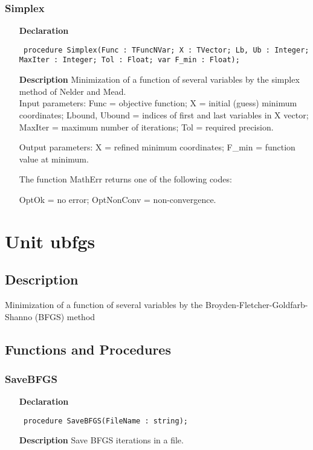 \documentclass[12pt,a4paper,oneside]{report}
\newcommand{\declarationitem}[1]{\textbf{#1}}
\newcommand{\descriptiontitle}[1]{\textbf{#1}}
\newcommand{\code}[1]{\texttt{#1}}
\begin{document}
\subsubsection{Simplex}
\label{usimplex-Simplex}
\begin{itemize}\item[\declarationitem{Declaration}\hfill]
	\begin{flushleft}
		\code{
			procedure Simplex(Func : TFuncNVar; X : TVector; Lb, Ub : Integer; MaxIter : Integer; Tol : Float; var F{\_}min : Float);}
		
	\end{flushleft}
	
	\par
	\item[\descriptiontitle{Description}]
	Minimization of a function of several variables by the simplex method of Nelder and Mead. \\
	Input parameters: Func = objective function; X = initial (guess) minimum coordinates; Lbound, Ubound = indices of first and last variables in X vector; MaxIter = maximum number of iterations; Tol = required precision.
	
	Output parameters: X = refined minimum coordinates; F{\_}min = function value at minimum.
	
	The function MathErr returns one of the following codes:
	
	OptOk = no error; OptNonConv = non{-}convergence.
	
\end{itemize}

\section{Unit ubfgs}
\label{ubfgs}
\subsection{Description}
Minimization of a function of several variables by the Broyden{-}Fletcher{-}Goldfarb{-}Shanno (BFGS) method 
\subsection{Functions and Procedures}
\subsubsection{SaveBFGS}
\label{ubfgs-SaveBFGS}
\begin{itemize}\item[\declarationitem{Declaration}\hfill]
	\begin{flushleft}
		\code{
			procedure SaveBFGS(FileName : string);}
		
	\end{flushleft}
	
	\par
	\item[\descriptiontitle{Description}]
	Save BFGS iterations in a file.
\end{itemize}
\end{document}
